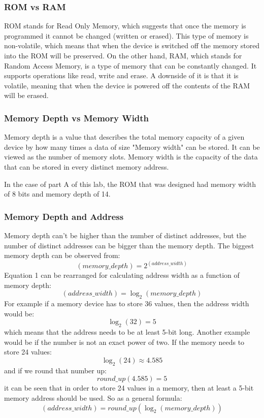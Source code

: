 \documentclass[10pt]{article}
\begin{document}
\subsubsection{ROM vs RAM}
ROM stands for Read Only Memory, which suggests that once the memory is programmed it cannot be changed (written or erased). This type of memory is non-volatile, which means that when the device is switched off the memory stored into the ROM will be preserved.
On the other hand, RAM, which stands for Random Access Memory, is a type of memory that can be constantly changed. It supports operations like read, write and erase. A downside of it is that it is volatile, meaning that when the device is powered off the contents of the RAM will be erased.

\subsubsection{Memory Depth vs Memory Width}
Memory depth is a value that describes the total memory capacity of a given device by how many times a data of size "Memory width" can be stored. It can be viewed as the number of memory slots.
Memory width is the capacity of the data that can be stored in every distinct memory address.

In the case of part A of this lab, the ROM that was designed had memory width of 8 bits and memory depth of 14.

\subsubsection{Memory Depth and Address}
Memory depth can't be higher than the number of distinct addresses, but the number of distinct addresses can be bigger than the memory depth.
The biggest memory depth can be observed from:
\begin{equation}
(memory\_depth) = 2^{(address\_width)}
\end{equation}
Equation 1 can be rearranged for calculating address width as a function of memory depth:
\begin{equation}
(address\_width) = \log_2 (memory\_depth)
\end{equation}
For example if a memory device has to store 36 values, then the address width would be:
\[\log_2 (32) = 5\] 
which means that the address needs to be at least 5-bit long.
Another example would be if the number is not an exact power of two. If the memory needs to store 24 values: 
\[\log_2 (24) \approx 4.585\]
and if we round that number up:
\[round\_up(4.585) = 5\]
it can be seen that in order to store 24 values in a memory, then at least a 5-bit memory address should be used.
So as a general formula:
\begin{equation}
(address\_width) = round\_up(\log_2 (memory\_depth))
\end{equation}
\end{document}

